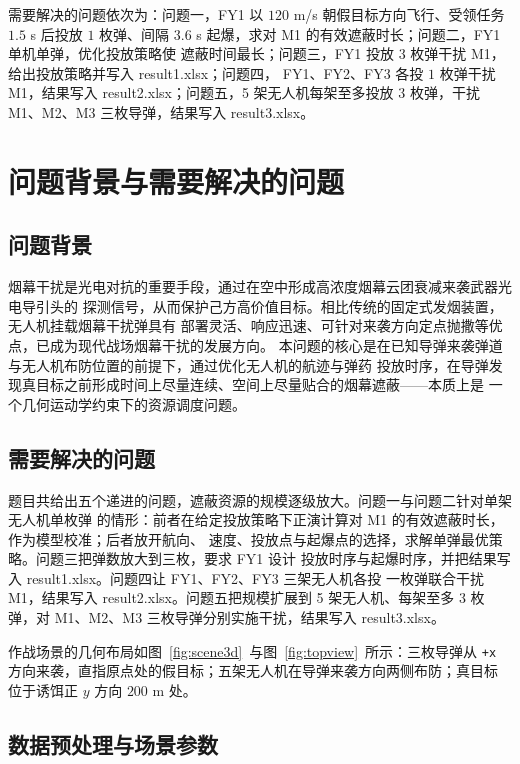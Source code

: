 \documentclass[12pt, a4paper]{article}
\begin{document}
需要解决的问题依次为：问题一，FY1 以 $120$ m/s 朝假目标方向飞行、受领任务 $1.5$ s 后投放
$1$ 枚弹、间隔 $3.6$ s 起爆，求对 M1 的有效遮蔽时长；问题二，FY1 单机单弹，优化投放策略使
遮蔽时间最长；问题三，FY1 投放 $3$ 枚弹干扰 M1，给出投放策略并写入 result1.xlsx；问题四，
FY1、FY2、FY3 各投 $1$ 枚弹干扰 M1，结果写入 result2.xlsx；问题五，5 架无人机每架至多投放
$3$ 枚弹，干扰 M1、M2、M3 三枚导弹，结果写入 result3.xlsx。

\section{问题背景与需要解决的问题}

\subsection{问题背景}

烟幕干扰是光电对抗的重要手段，通过在空中形成高浓度烟幕云团衰减来袭武器光电导引头的
探测信号，从而保护己方高价值目标。相比传统的固定式发烟装置，无人机挂载烟幕干扰弹具有
部署灵活、响应迅速、可针对来袭方向定点抛撒等优点，已成为现代战场烟幕干扰的发展方向。
本问题的核心是在已知导弹来袭弹道与无人机布防位置的前提下，通过优化无人机的航迹与弹药
投放时序，在导弹发现真目标之前形成时间上尽量连续、空间上尽量贴合的烟幕遮蔽——本质上是
一个几何运动学约束下的资源调度问题。

\subsection{需要解决的问题}

题目共给出五个递进的问题，遮蔽资源的规模逐级放大。问题一与问题二针对单架无人机单枚弹
的情形：前者在给定投放策略下正演计算对 M1 的有效遮蔽时长，作为模型校准；后者放开航向、
速度、投放点与起爆点的选择，求解单弹最优策略。问题三把弹数放大到三枚，要求 FY1 设计
投放时序与起爆时序，并把结果写入 result1.xlsx。问题四让 FY1、FY2、FY3 三架无人机各投
一枚弹联合干扰 M1，结果写入 result2.xlsx。问题五把规模扩展到 5 架无人机、每架至多 3 枚
弹，对 M1、M2、M3 三枚导弹分别实施干扰，结果写入 result3.xlsx。

作战场景的几何布局如图~\ref{fig:scene3d}~与图~\ref{fig:topview}~所示：三枚导弹从
\texttt{+x} 方向来袭，直指原点处的假目标；五架无人机在导弹来袭方向两侧布防；真目标
位于诱饵正 $y$ 方向 $200$ m 处。

\subsection{数据预处理与场景参数}
\end{document}
